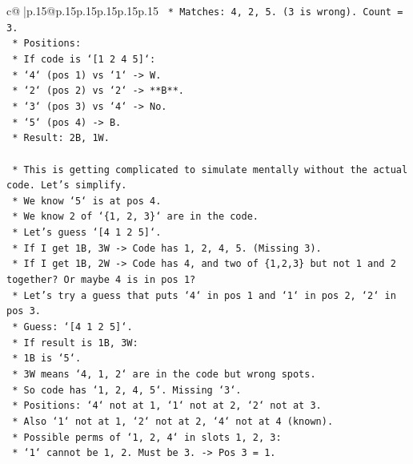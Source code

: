\documentclass{article}
\begin{document}
{\begin{supertabular}{c@{$\;$}|p{.15\linewidth}@{}p{.15\linewidth}p{.15\linewidth}p{.15\linewidth}p{.15\linewidth}p{.15\linewidth}}
{{{\texttt{            *   Matches: 4, 2, 5. (3 is wrong). Count = 3.} \\
\texttt{            *   Positions:} \\
\texttt{                *   If code is `{[}1 2 4 5{]}`:} \\
\texttt{                    *   `4` (pos 1) vs `1` {-}> W.} \\
\texttt{                    *   `2` (pos 2) vs `2` {-}> **B**.} \\
\texttt{                    *   `3` (pos 3) vs `4` {-}> No.} \\
\texttt{                    *   `5` (pos 4) {-}> B.} \\
\texttt{                    *   Result: 2B, 1W.} \\
\\ 
\texttt{    *   This is getting complicated to simulate mentally without the actual code. Let's simplify.} \\
\texttt{    *   We know `5` is at pos 4.} \\
\texttt{    *   We know 2 of `\{1, 2, 3\}` are in the code.} \\
\texttt{    *   Let's guess `{[}4 1 2 5{]}`.} \\
\texttt{        *   If I get 1B, 3W {-}> Code has 1, 2, 4, 5. (Missing 3).} \\
\texttt{        *   If I get 1B, 2W {-}> Code has 4, and two of \{1,2,3\} but not 1 and 2 together? Or maybe 4 is in pos 1?} \\
\texttt{        *   Let's try a guess that puts `4` in pos 1 and `1` in pos 2, `2` in pos 3.} \\
\texttt{        *   Guess: `{[}4 1 2 5{]}`.} \\
\texttt{        *   If result is 1B, 3W:} \\
\texttt{            *   1B is `5`.} \\
\texttt{            *   3W means `4, 1, 2` are in the code but wrong spots.} \\
\texttt{            *   So code has `1, 2, 4, 5`. Missing `3`.} \\
\texttt{            *   Positions: `4` not at 1, `1` not at 2, `2` not at 3.} \\
\texttt{            *   Also `1` not at 1, `2` not at 2, `4` not at 4 (known).} \\
\texttt{            *   Possible perms of `1, 2, 4` in slots 1, 2, 3:} \\
\texttt{                *   `1` cannot be 1, 2. Must be 3. {-}> Pos 3 = 1.} \\
}}}
\end{supertabular}}
\end{document}
